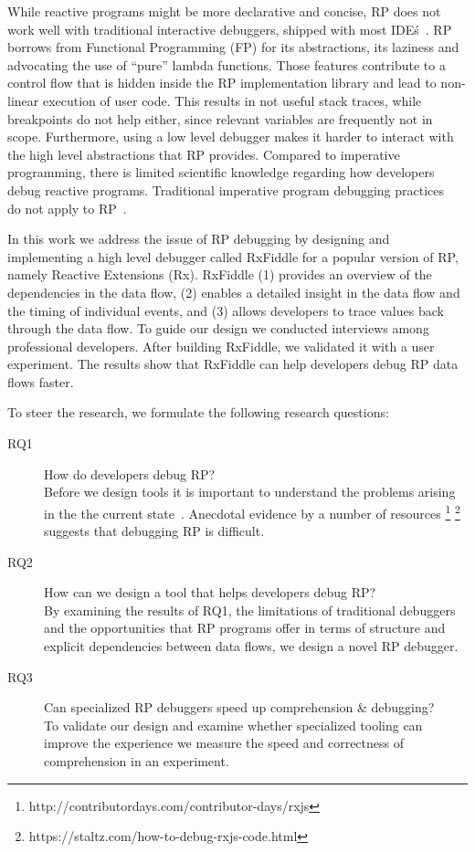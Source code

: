 While reactive programs might be more declarative and concise, RP does
not work well with traditional interactive debuggers, shipped with most
IDE\'s~\cite{salvaneschi2016debugging}.  RP borrows from Functional
Programming (FP) for its abstractions, its laziness and advocating the
use of ``pure'' lambda functions.  Those features contribute to a
control flow that is hidden inside the RP implementation library and
lead to non-linear execution of user code.  This results in not useful
stack traces, while breakpoints do not help either, since relevant variables
are frequently not in scope.  Furthermore, using a low level debugger makes
it harder to interact with the high level abstractions that RP provides.
Compared to imperative programming, there is limited scientific
knowledge regarding how developers debug reactive programs.  Traditional
imperative program debugging practices~\cite{beller2017behavior} do not
apply to RP~\cite{salvaneschi2016debugging}.

In this work we address the issue of RP debugging by designing and
implementing a high level debugger called RxFiddle for a popular version
of RP, namely Reactive Extensions (Rx).  RxFiddle (1) provides an
overview of the dependencies in the data flow, (2) enables a detailed
insight in the data flow and the timing of individual events, and (3)
allows developers to trace values back through the data flow.  To guide
our design we conducted interviews among professional developers.  After
building RxFiddle, we validated it with a user experiment.  The results
show that RxFiddle can help developers debug RP data flows faster.

To steer the research, we formulate the following research questions:

\begin{description}
    \item[RQ1]
        How do developers debug RP?  \\
        Before we design tools it is important to understand the
        problems arising in the the current state~\cite{singer2010examination}.
        Anecdotal evidence by a number of resources%
        \footnote{%
        \label{foot:contribdays}http://contributordays.com/contributor-days/rxjs}%
        \footnote{https://staltz.com/how-to-debug-rxjs-code.html}
        suggests that debugging RP is difficult.

    \item[RQ2]
        How can we design a tool that helps developers debug RP?  \\
        By examining the results of RQ1, the limitations of traditional
        debuggers and the opportunities that RP programs offer in terms
        of structure and explicit dependencies between data flows, we
        design a novel RP debugger.

    \item[RQ3]
        Can specialized RP debuggers speed up comprehension \&
        debugging?  \\
        To validate our design and examine whether specialized tooling
        can improve the experience we measure the speed and correctness
        of comprehension in an experiment.

\end{description}
